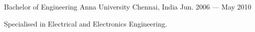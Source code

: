 
\begin{cventries}

  \cventry
  {Bachelor of Engineering} %
  {Anna University} %
  {Chennai, India} %
  {Jun. 2006 --- May 2010} %
  {
    \begin{cvitems} %
      \item {Specialised in Electrical and Electronics Engineering.}
    \end{cvitems}
  }

\end{cventries}
